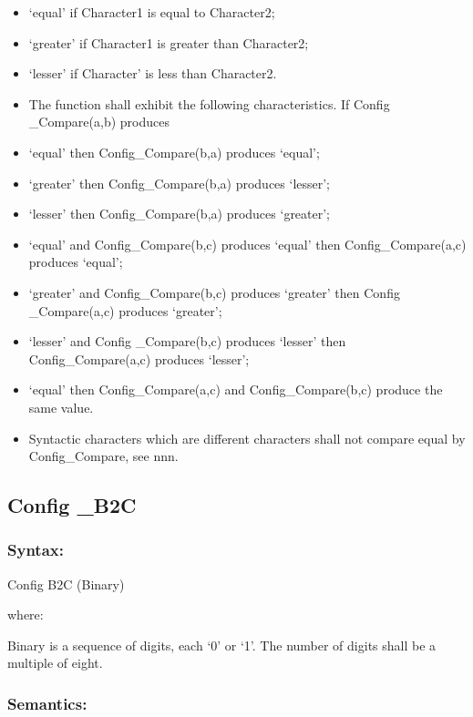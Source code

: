 \begin{itemize}
\item
  `equal' if Character1 is equal to Character2;
\item
  `greater' if Character1 is greater than Character2;
\item
  `lesser' if Character' is less than Character2.
\item
  The function shall exhibit the following characteristics. If Config
  \_Compare(a,b) produces
\item
  `equal' then Config\_Compare(b,a) produces `equal';
\item
  `greater' then Config\_Compare(b,a) produces `lesser';
\item
  `lesser' then Config\_Compare(b,a) produces `greater';
\item
  `equal' and Config\_Compare(b,c) produces `equal' then
  Config\_Compare(a,c) produces `equal';
\item
  `greater' and Config\_Compare(b,c) produces `greater' then Config
  \_Compare(a,c) produces `greater';
\item
  `lesser' and Config \_Compare(b,c) produces `lesser' then
  Config\_Compare(a,c) produces `lesser';
\item
  `equal' then Config\_Compare(a,c) and Config\_Compare(b,c) produce the
  same value.
\item
  Syntactic characters which are different characters shall not compare
  equal by Config\_Compare, see nnn.
\end{itemize}

\subsection{Config \_B2C}\label{config-_b2c}

\subsubsection{Syntax:}\label{syntax-5}

Config B2C (Binary)

where:

Binary is a sequence of digits, each `0' or `1'. The number of digits
shall be a multiple of eight.

\subsubsection{Semantics:}\label{semantics-6}


